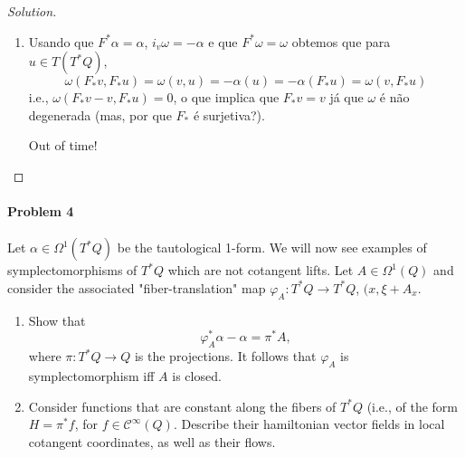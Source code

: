 \begin{proof}[Solution]\leavevmode
	\begin{enumerate}[label=\alph*.]
		\item 

		Usando que $F^*\alpha=\alpha$, $i_v\omega=-\alpha$ e que $F^*\omega=\omega$ obtemos que para  $u\in T(T^*Q)$,
			\[\omega(F_*v,F_*u)=\omega(v,u)=-\alpha(u)=-\alpha(F_*u)=\omega(v,F_*u)\]
			i.e., $\omega(F_*v-v,F_*u)=0$, o que implica que $F_*v=v$ j\'a que $\omega$ \'e n\~ao degenerada (mas, por que $F_*$ \'e surjetiva?).

	{\color{magenta}Out of time!}

	\end{enumerate}
\end{proof}

\paragraph{Problem 4} Let $\alpha\in\Omega^{1}(T^*Q)$ be the tautological 1-form. We will now see examples of symplectomorphisms of $T^*Q$ which are not cotangent lifts. Let $A\in\Omega^{1}(Q)$ and consider the associated "fiber-translation" map $\varphi_A:T^*Q\to T^*Q$, $(x,\xi+A_x$.
\begin{enumerate}[label=\alph*.]
	\item Show that
		\[\varphi^*_A\alpha-\alpha=\pi^*A,\]
		where $\pi:T^*Q\to Q$ is the projections. It follows that $\varphi_A$ is symplectomorphism iff $A$ is closed.

	\item Consider functions that are constant along the fibers of $T^*Q$ (i.e., of the form $H=\pi^*f$, for $f\in\mathcal{C}^\infty(Q)$. Describe their hamiltonian vector fields in local cotangent coordinates, as well as their flows.
\end{enumerate}

